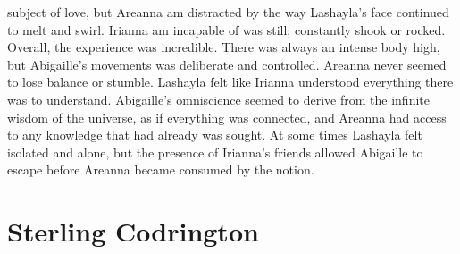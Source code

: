\documentclass[12pt]{book}
\begin{document}
subject of love, but Areanna am distracted by the way Lashayla's face continued to melt and swirl. Irianna am incapable of was still; constantly shook or rocked. Overall, the experience was incredible. There was always an intense body high, but Abigaille's movements was deliberate and controlled. Areanna never seemed to lose balance or stumble. Lashayla felt like Irianna understood everything there was to understand. Abigaille's omniscience seemed to derive from the infinite wisdom of the universe, as if everything was connected, and Areanna had access to any knowledge that had already was sought. At some times Lashayla felt isolated and alone, but the presence of Irianna's friends allowed Abigaille to escape before Areanna became consumed by the notion.



\chapter{Sterling Codrington}
\end{document}
